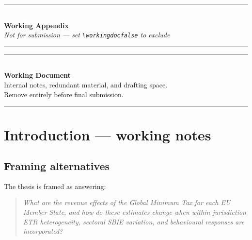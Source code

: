 \documentclass[11pt,a4paper]{article}
\begin{document}
\ifworkingdoc

\newpage

\begin{center}
  \rule{\textwidth}{1pt}\\[0.8em]
  {\Large\bfseries Working Appendix}\\[0.4em]
  {\normalsize\itshape Not for submission ---
    set \texttt{\textbackslash workingdocfalse} to exclude}\\[0.8em]
  \rule{\textwidth}{1pt}
\end{center}

\vspace{1em}

\renewcommand{\thesection}{W.\arabic{section}}
\setcounter{section}{0}
\setcounter{table}{0}
\setcounter{figure}{0}
\setcounter{equation}{0}

\begin{center}
\rule{0.8\textwidth}{1pt}\\[1em]
{\Large\bfseries Working Document}\\[0.5em]
{\normalsize Internal notes, redundant material, and drafting space.\\Remove entirely before final submission.}\\[0.5em]
\rule{0.8\textwidth}{1pt}
\end{center}


\section{Introduction --- working notes}\label{w:intro}

\subsection{Framing alternatives}

The thesis is framed as answering:

\begin{quote}
\textit{What are the revenue effects of the Global Minimum Tax for each EU Member State, and how do these estimates change when within-jurisdiction ETR heterogeneity, sectoral SBIE variation, and behavioural responses are incorporated?}
\end{quote}
\end{document}
